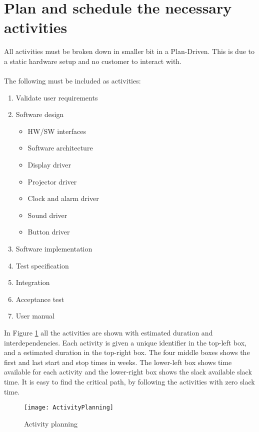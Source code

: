 \documentclass[Main]{subfiles}
\begin{document}
\section{Plan and schedule the necessary activities} 

All activities must be broken down in smaller bit in a Plan-Driven.
This is due to a static hardware setup and no customer to interact with.
\\
\\
The following must be included as activities:
\begin{enumerate}
	\item Validate user requirements
	\item Software design
	\begin{itemize}
		\item HW/SW interfaces
		\item Software architecture
		\item Display driver
		\item Projector driver
		\item Clock and alarm driver
		\item Sound driver
		\item Button driver
	\end{itemize}
	\item Software implementation
	\item Test specification
	\item Integration
	\item Acceptance test
	\item User manual
\end{enumerate}

In Figure \ref{fig:activityPlanning} all the activities are shown with estimated duration and interdependencies. Each activity is given a unique identifier in the top-left box, and a estimated duration in the top-right box. The four middle boxes shows the first and last start and stop times in weeks. The lower-left box shows time available for each activity and the lower-right box shows the slack available slack time. It is easy to find the critical path, by following the activities with zero slack time.

\begin{figure}[hbtp]
\centering
\texttt{[image: ActivityPlanning]}
\caption{Activity planning}
\label{fig:activityPlanning}
\end{figure}
\end{document}
